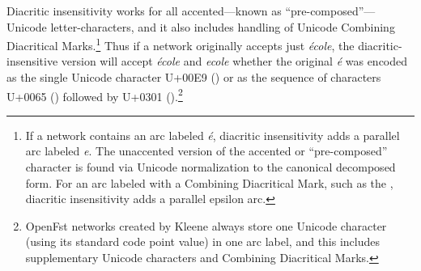 \vspace{0.5cm}

Diacritic insensitivity works for all accented---known as
``pre-composed''---Unicode letter-characters, and it also includes
handling of Unicode Combining Diacritical Marks.\footnote{If a network
contains an arc labeled \emph{\'e}, diacritic insensitivity adds a
parallel arc labeled \emph{e}.  The unaccented version of the accented or
``pre-composed'' character is found via Unicode normalization to the
canonical decomposed  form.  For an arc labeled with a
Combining Diacritical Mark, such as the ,
diacritic insensitivity adds a parallel epsilon arc.}  Thus if a network
originally accepts just \emph{\'ecole}, the diacritic-insensitive version
will accept \emph{\'ecole} and \emph{ecole} whether the original
\emph{\'e} was encoded as the single Unicode character U+00E9
() or as the sequence of characters
U+0065 () followed by U+0301 ().\footnote{OpenFst networks created by Kleene always store
one Unicode character (using its standard code point value) in one arc
label, and this includes supplementary Unicode characters and Combining
Diacritical Marks.}


